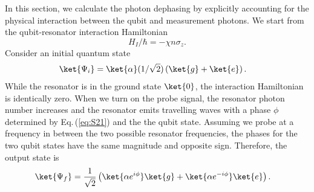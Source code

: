 
In this section, we calculate the photon dephasing by explicitly accounting for the physical interaction between the qubit and measurement photons.
We start from the qubit-resonator interaction Hamiltonian \begin{equation}
H_I/\hbar = -\chi n \sigma_z . \end{equation}
Consider an initial quantum state \begin{align}
\ket{\Psi_i}
&= \ket{\alpha}(1/\sqrt{2})\left( \ket{g} + \ket{e} \right) . \end{align}
While the resonator is in the ground state $\ket{0}$, the interaction Hamiltonian is identically zero.
When we turn on the probe signal, the resonator photon number increases and the resonator emits travelling waves with a phase $\phi$ determined by Eq.\,(\ref{eq:S21}) and the the qubit state.
Assuming we probe at a frequency in between the two possible resonator frequencies, the phases for the two qubit states have the same magnitude and opposite sign.
Therefore, the output state is \begin{align}
\ket{\Psi_f} &= \frac{1}{\sqrt{2}} \left( \ket{\alpha e^{i \phi}}\ket{g} + \ket{\alpha e^{-i \phi}}\ket{e} \right) . \label{eq:sec:measurementInducedDephasing:dispersedState} \end{align}


